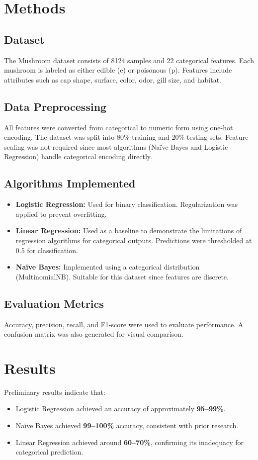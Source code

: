 \documentclass[conference]{IEEEtran}
\begin{document}
\section{Methods}
\subsection{Dataset}
The Mushroom dataset consists of 8124 samples and 22 categorical features. Each mushroom is labeled as either edible (e) or poisonous (p). Features include attributes such as cap shape, surface, color, odor, gill size, and habitat.

\subsection{Data Preprocessing}
All features were converted from categorical to numeric form using one-hot encoding. The dataset was split into 80\% training and 20\% testing sets. Feature scaling was not required since most algorithms (Naïve Bayes and Logistic Regression) handle categorical encoding directly.

\subsection{Algorithms Implemented}
\begin{itemize}
    \item \textbf{Logistic Regression:} Used for binary classification. Regularization was applied to prevent overfitting.
    \item \textbf{Linear Regression:} Used as a baseline to demonstrate the limitations of regression algorithms for categorical outputs. Predictions were thresholded at 0.5 for classification.
    \item \textbf{Naïve Bayes:} Implemented using a categorical distribution (MultinomialNB). Suitable for this dataset since features are discrete.
\end{itemize}

\subsection{Evaluation Metrics}
Accuracy, precision, recall, and F1-score were used to evaluate performance. A confusion matrix was also generated for visual comparison.

\section{Results}
Preliminary results indicate that:
\begin{itemize}
    \item Logistic Regression achieved an accuracy of approximately \textbf{95–99\%}.
    \item Naïve Bayes achieved \textbf{99–100\%} accuracy, consistent with prior research.
    \item Linear Regression achieved around \textbf{60–70\%}, confirming its inadequacy for categorical prediction.
\end{itemize}
\end{document}
